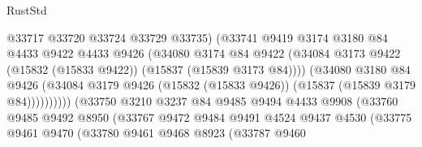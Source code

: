 \begin{lexlean}{RustStd}
\begin{coremodule}
                                      @33717
                                      @33720
                                      @33724
                                      @33729
                                      @33735)
                                    (@33741
                                      @9419
                                      @3174
                                      @3180
                                      @84
                                      @4433
                                      @9422
                                      @4433
                                      @9426
                                      (@34080
                                        @3174
                                        @84
                                        @9422
                                        (@34084
                                          @3173
                                          @9422
                                          (@15832 (@15833 @9422))
                                          (@15837 (@15839 @3173 @84))))
                                      (@34080
                                        @3180
                                        @84
                                        @9426
                                        (@34084
                                          @3179
                                          @9426
                                          (@15832 (@15833 @9426))
                                          (@15837 (@15839 @3179 @84))))))))))
                          (@33750
                            @3210
                            @3237
                            @84
                            @9485
                            @9494
                            @4433
                            @9908
                            (@33760
                              @9485
                              @9492
                              @8950
                              (@33767
                                @9472
                                @9484
                                @9491
                                @4524
                                @9437
                                @4530
                                (@33775
                                  @9461
                                  @9470
                                  (@33780
                                    @9461
                                    @9468
                                    @8923
                                    (@33787
                                      @9460

\end{coremodule}
\end{lexlean}
